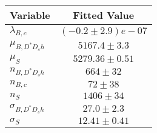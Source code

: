 \begin{tabular}[t]{lc}
\hline
Variable &Fitted Value\\
\hline\hline
$\lambda_{B,c}$&$(-0.2\pm2.9)e-07$\\
\hline
$\mu_{B, D^* D_s h}$&$5167.4\pm3.3$\\
\hline
$\mu_S$&$5279.36\pm0.51$\\
\hline
$n_{B, D^* D_s h}$&$664\pm32$\\
\hline
$n_{B,c}$&$72\pm38$\\
\hline
$n_S$&$1406\pm34$\\
\hline
$\sigma_{B, D^* D_s h}$&$27.0\pm2.3$\\
\hline
$\sigma_S$&$12.41\pm0.41$\\
\hline
\end{tabular}